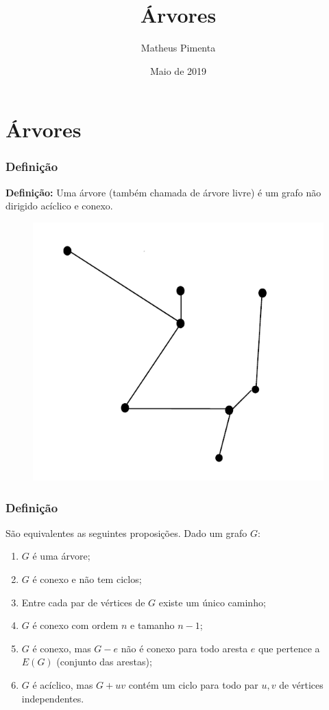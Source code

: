 \documentclass[hyperref={pdfpagelabels=false}]{beamer}
\title{Árvores}
\author[Matheus Pimenta]{Matheus Pimenta}
\institute[UTFPR-CP]{\normalsize Universidade Tecnológica Federal do Paraná \\
	Câmpus Cornélio Procópio
}
\date{Maio de 2019}
\begin{document}
	
\begin{frame}
\titlepage
\end{frame} 




\section{Árvores} 


\begin{frame}
\frametitle{Definição} 
{\bf Definição:} Uma árvore (também chamada de árvore livre) é um grafo não dirigido acíclico e conexo.

\begin{figure}[!h]
	\centering
	\includegraphics[scale=0.4]{01}
	\label{01}
\end{figure}


\end{frame}

\begin{frame}
\frametitle{Definição}
São equivalentes as seguintes proposições. Dado um grafo $G$:
\begin{enumerate}
	\item $G$ é uma árvore;
	\item $G$ é conexo e não tem ciclos;
	\item Entre cada par de vértices de $G$ existe um único caminho;
	\item $G$ é conexo com ordem $n$ e tamanho $n-1$;
	\item $G$ é conexo, mas $G-e$ não é conexo para todo aresta $e$ que pertence a $E(G)$ (conjunto das arestas);
	\item $G$ é acíclico, mas $G + uv$ contém um ciclo para todo par $u,v$ de vértices independentes.
\end{enumerate}

\end{frame}
\end{document}
